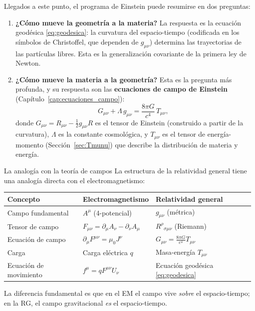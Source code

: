 Llegados a este punto, el programa de Einstein puede resumirse en dos preguntas:

\begin{enumerate}[leftmargin=2em]
  \item \textbf{¿Cómo mueve la geometría a la materia?} La respuesta es la ecuación geodésica \eqref{eq:geodesica}: la curvatura del espacio-tiempo (codificada en los símbolos de Christoffel, que dependen de $g_{\mu\nu}$) determina las trayectorias de las partículas libres. Esta es la generalización covariante de la primera ley de Newton.

  \item \textbf{¿Cómo mueve la materia a la geometría?} Esta es la pregunta más profunda, y su respuesta son las \textbf{ecuaciones de campo de Einstein} (Capítulo~\ref{cap:ecuaciones_campo}):
  \begin{equation}
    G_{\mu\nu} + \Lambda\,g_{\mu\nu} = \frac{8\pi G}{c^4}\,T_{\mu\nu},
    \label{eq:Einstein_preview}
  \end{equation}
  donde $G_{\mu\nu} = R_{\mu\nu} - \frac{1}{2}g_{\mu\nu}R$ es el tensor de Einstein (construido a partir de la curvatura), $\Lambda$ es la constante cosmológica, y $T_{\mu\nu}$ es el tensor de energía-momento (Sección~\ref{sec:Tmunu}) que describe la distribución de materia y energía.
\end{enumerate}

\begin{observacion}{La analogía con la teoría de campos}{}
La estructura de la relatividad general tiene una analogía directa con el electromagnetismo:
\begin{center}
\renewcommand{\arraystretch}{1.5}
\begin{tabular}{lll}
\hline
\textbf{Concepto} & \textbf{Electromagnetismo} & \textbf{Relatividad general} \\
\hline
Campo fundamental & $A^\mu$ (4-potencial) & $g_{\mu\nu}$ (métrica) \\
Tensor de campo & $F_{\mu\nu} = \partial_\mu A_\nu - \partial_\nu A_\mu$ & $R^\rho{}_{\sigma\mu\nu}$ (Riemann) \\
Ecuación de campo & $\partial_\mu F^{\mu\nu} = \mu_0 J^\nu$ & $G_{\mu\nu} = \frac{8\pi G}{c^4}T_{\mu\nu}$ \\
Carga & Carga eléctrica $q$ & Masa-energía $T_{\mu\nu}$ \\
Ecuación de movimiento & $f^\mu = q F^{\mu\nu}U_\nu$ & Ecuación geodésica \eqref{eq:geodesica} \\
\hline
\end{tabular}
\end{center}
La diferencia fundamental es que en el EM el campo vive \emph{sobre} el espacio-tiempo; en la RG, el campo gravitacional \emph{es} el espacio-tiempo.
\end{observacion}

